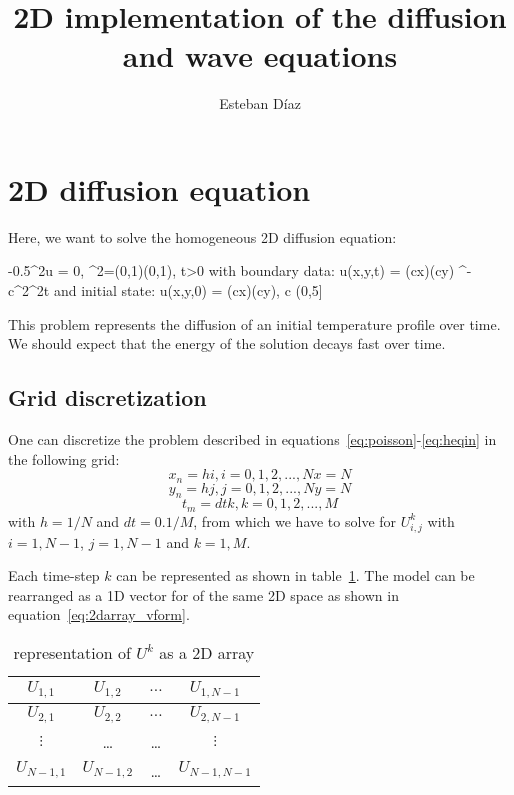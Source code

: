 \documentclass[10pt]{article}
\author{Esteban D\'{i}az}
\title{2D implementation of the diffusion and wave equations}{}
\def\exp#1{\mathbf{e}^{#1}}
\begin{document}


\maketitle

\section{2D diffusion equation}

Here, we want to solve the homogeneous 2D diffusion equation:

\beq
{} -0.5\nabla^2u = 0, \Omega^2=(0,1)\times(0,1),\forall \text{  } t>0
\label{eq:poisson}
\eeq
with boundary data:
\beq
u(x,y,t) = \sin(c\pi x)\cos(c\pi y) \exp{-c^2\pi^2t}
\label{eq:boundary}
\eeq
and initial state:
\beq
u(x,y,0) = \sin(c\pi x)\sin(c\pi y), c \in (0,5] 
\label{eq:heqin}
\eeq

This problem represents the diffusion of an initial temperature profile over time. We
should expect that the energy of the solution decays fast over time.

\subsection{Grid discretization}
One can discretize the problem described in 
equations~\ref{eq:poisson}-\ref{eq:heqin} in the following grid:
\[
x_n = hi, i = 0,1,2,...,Nx=N
\]
\[
y_n = hj, j = 0,1,2,...,Ny=N
\]
\[
t_m = {dt} k, k = 0,1,2,...,M
\]
with $h = 1/N$ and $dt=0.1/M$,
from which we have to solve for $U^k_{i,j}$ with $i=1,N-1$, $j=1,N-1$ and $k=1,M$.


Each time-step $k$ can be represented as shown in table~\ref{tab:2darray}.
The model can be rearranged as a 1D vector for of the same 2D space as shown
in equation~\ref{eq:2darray_vform}.


\begin{table}
\centering
  \begin{tabular}{|c | c | c | c|}
\hline
$U_{1,1}$  &  $U_{1,2}$  & $\dots$  & $U_{1,N-1}$ \\  \hline
$U_{2,1}$  &  $U_{2,2}$  & $\dots$  & $U_{2,N-1}$ \\  \hline 
$\vdots$   &  \dots  & \dots    & $\vdots$    \\  \hline
$U_{N-1,1}$  &  $U_{N-1,2}$  & \dots  & $U_{N-1,N-1}$ \\  \hline
  \end{tabular}
\caption{representation of $U^k$ as a 2D array}
\label{tab:2darray}
\end{table}
\end{document}
